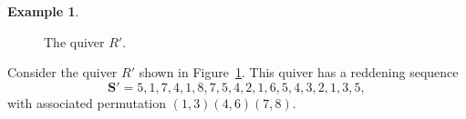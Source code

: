 \documentclass[11pt, letterpaper]{amsart}
\theoremstyle{definition}
\newtheorem{example}[theorem]{Example}
\numberwithin{equation}{section}
\begin{document}
\begin{example}
\label{eg:positroid reddening}
\begin{figure}[ht]
    \centering
    \caption{The quiver $R'$.}
    \label{fig:positroid reddening}
\end{figure}
Consider the quiver $R'$ shown in Figure~\ref{fig:positroid reddening}.
This quiver has a reddening sequence 
$$\mathbf S' = 5, 1, 7, 4, 1, 8, 7, 5, 4, 2, 1, 6, 5, 4, 3, 2, 1, 3, 5,$$ 
with associated permutation $(1,3) (4,6) (7,8)$.
\end{example}
\end{document}
